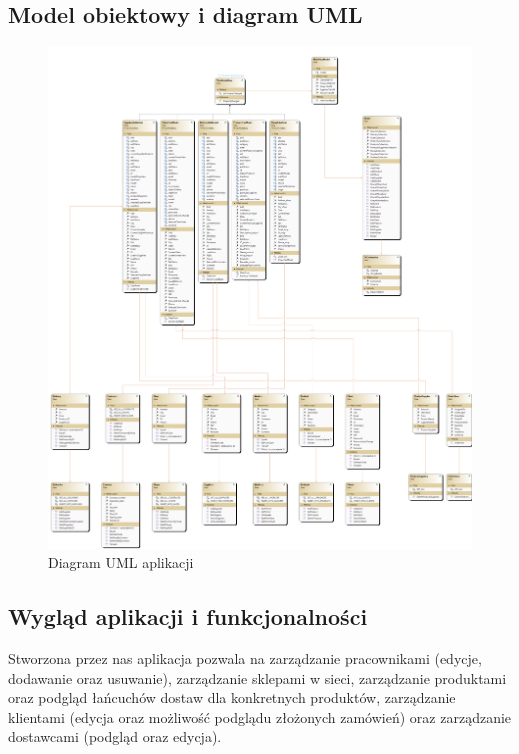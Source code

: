 \documentclass[12pt,a4paper]{article}
\begin{document}
    \subsection{Model obiektowy i diagram UML}
        \begin{figure}[H]
            \centering
            \includegraphics[width=\textwidth]{images/ClassDiagram1.png}
            \caption{Diagram UML aplikacji}
        \end{figure}
        
    \subsection{Wygląd aplikacji i funkcjonalności}
        Stworzona przez nas aplikacja pozwala na zarządzanie pracownikami (edycje, dodawanie oraz usuwanie), zarządzanie sklepami w sieci, zarządzanie produktami oraz podgląd łańcuchów dostaw dla konkretnych produktów, zarządzanie klientami (edycja oraz możliwość podglądu złożonych zamówień) oraz zarządzanie dostawcami (podgląd oraz edycja).
            
\end{document}
